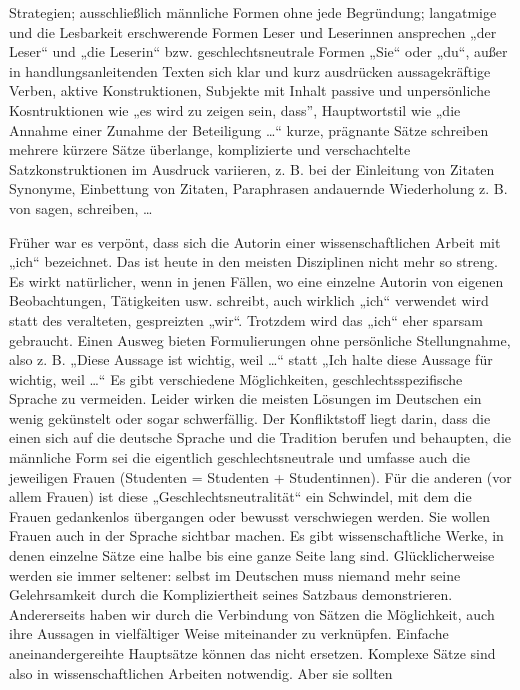 \documentclass[]{book}
\theoremstyle{definition}
\theoremstyle{definition}
\theoremstyle{definition}
\theoremstyle{remark}
\begin{document}
Strategien; ausschließlich männliche Formen ohne jede Begründung;
langatmige und die Lesbarkeit erschwerende Formen Leser und Leserinnen
ansprechen „der Leser`` und „die Leserin`` bzw. geschlechtsneutrale
Formen „Sie`` oder „du``, außer in handlungsanleitenden Texten sich klar
und kurz ausdrücken aussagekräftige Verben, aktive Konstruktionen,
Subjekte mit Inhalt passive und unpersönliche Kosntruktionen wie „es
wird zu zeigen sein, dass'', Hauptwortstil wie „die Annahme einer
Zunahme der Beteiligung \ldots{}`` kurze, prägnante Sätze schreiben
mehrere kürzere Sätze überlange, komplizierte und verschachtelte
Satzkonstruktionen im Ausdruck variieren, z. B. bei der Einleitung von
Zitaten Synonyme, Einbettung von Zitaten, Paraphrasen andauernde
Wiederholung z. B. von sagen, schreiben, \ldots{}

Früher war es verpönt, dass sich die Autorin einer wissenschaftlichen
Arbeit mit „ich`` bezeichnet. Das ist heute in den meisten Disziplinen
nicht mehr so streng. Es wirkt natürlicher, wenn in jenen Fällen, wo
eine einzelne Autorin von eigenen Beobachtungen, Tätigkeiten usw.
schreibt, auch wirklich „ich`` verwendet wird statt des veralteten,
gespreizten „wir``. Trotzdem wird das „ich`` eher sparsam gebraucht.
Einen Ausweg bieten Formulierungen ohne persönliche Stellungnahme, also
z. B. „Diese Aussage ist wichtig, weil \ldots{}`` statt „Ich halte diese
Aussage für wichtig, weil \ldots{}`` Es gibt verschiedene Möglichkeiten,
geschlechtsspezifische Sprache zu vermeiden. Leider wirken die meisten
Lösungen im Deutschen ein wenig gekünstelt oder sogar schwerfällig. Der
Konfliktstoff liegt darin, dass die einen sich auf die deutsche Sprache
und die Tradition berufen und behaupten, die männliche Form sei die
eigentlich geschlechtsneutrale und umfasse auch die jeweiligen Frauen
(Studenten = Studenten + Studentinnen). Für die anderen (vor allem
Frauen) ist diese „Geschlechtsneutralität`` ein Schwindel, mit dem die
Frauen gedankenlos übergangen oder bewusst verschwiegen werden. Sie
wollen Frauen auch in der Sprache sichtbar machen. Es gibt
wissenschaftliche Werke, in denen einzelne Sätze eine halbe bis eine
ganze Seite lang sind. Glücklicherweise werden sie immer seltener:
selbst im Deutschen muss niemand mehr seine Gelehrsamkeit durch die
Kompliziertheit seines Satzbaus demonstrieren. Andererseits haben wir
durch die Verbindung von Sätzen die Möglichkeit, auch ihre Aussagen in
vielfältiger Weise miteinander zu verknüpfen. Einfache
aneinandergereihte Hauptsätze können das nicht ersetzen. Komplexe Sätze
sind also in wissenschaftlichen Arbeiten notwendig. Aber sie sollten
\end{document}
